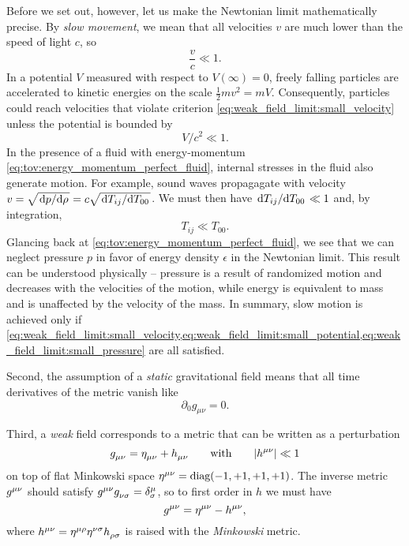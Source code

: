 Before we set out, however, let us make the Newtonian limit mathematically precise.
By \emph{slow movement}, we mean that all velocities $v$ are much lower than the speed of light $c$, so
\begin{equation}
	\frac{v}{c} \ll 1 .
	\label{eq:weak_field_limit:small_velocity}
\end{equation}
In a potential $V$ measured with respect to $V(\infty) = 0$, freely falling particles are accelerated to kinetic energies on the scale $\frac12 m v^2 = m V$.
Consequently, particles could reach velocities that violate criterion \eqref{eq:weak_field_limit:small_velocity} unless the potential is bounded by
\begin{equation}
	V/c^2 \ll 1 .
	\label{eq:weak_field_limit:small_potential}
\end{equation}
In the presence of a fluid with energy-momentum \eqref{eq:tov:energy_momentum_perfect_fluid}, internal stresses in the fluid also generate motion.
For example, sound waves propagagate with velocity $v = \sqrt{\odv{p}/{\rho}} = c \sqrt{\odv{T_{ij}}/{T_{00}}}$.
We must then have $\odv{T_{ij}}/{T_{00}} \ll 1$ and, by integration,
\begin{equation}
	T_{ij} \ll T_{00} .
	\label{eq:weak_field_limit:small_pressure}
\end{equation}
Glancing back at \cref{eq:tov:energy_momentum_perfect_fluid}, we see that we can neglect pressure $p$ in favor of energy density $\epsilon$ in the Newtonian limit.
This result can be understood physically -- pressure is a result of randomized motion and decreases with the velocities of the motion, while energy is equivalent to mass and is unaffected by the velocity of the mass.
In summary, slow motion is achieved only if \cref{eq:weak_field_limit:small_velocity,eq:weak_field_limit:small_potential,eq:weak_field_limit:small_pressure} are all satisfied.

Second, the assumption of a \emph{static} gravitational field means that all time derivatives of the metric vanish like
\begin{equation}
	\partial_0 g_{\mu \nu} = 0 .
	\label{eq:weak_field_limit:static_field}
\end{equation}

Third, a \emph{weak} field corresponds to a metric that can be written as a perturbation
\begin{equation}
	g\indices{_\mu_\nu} = \eta\indices{_\mu_\nu} + h\indices{_\mu_\nu}
	\qquad \text{with} \qquad
	\abs{h\indices{^\mu^\nu}} \ll 1
	\label{eq:weak_field_limit:weak_field_metric}
\end{equation}
on top of flat Minkowski space $\eta\indices{^\mu^\nu} = \text{diag}(-1, +1, +1, +1)$.
The inverse metric $g\indices{^\mu^\nu}$ should satisfy $g\indices{^\mu^\nu} g\indices{_\nu_\sigma} = \delta^\mu_\sigma$, so to first order in $h$ we must have
\begin{equation}
	g\indices{^\mu^\nu} = \eta\indices{^\mu^\nu} - h\indices{^\mu^\nu} ,
	\label{eq:weak_field_limit:weak_field_metric_inverse}
\end{equation}
where $h\indices{^\mu^\nu} = \eta\indices{^\mu^\rho} \eta\indices{^\nu^\sigma} h\indices{_\rho_\sigma}$ is raised with the \emph{Minkowski} metric.

